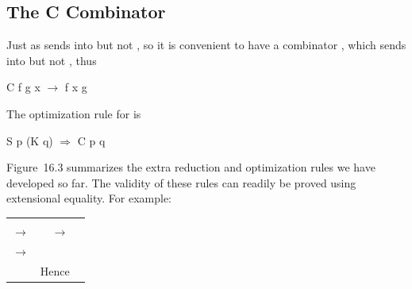 \subsection{The C Combinator}

Just as  sends  into  but not , so it is convenient to have a
combinator , which sends  into  but not , thus
\begin{mlcoded}
    C f g x $\rightarrow$ f x g
\end{mlcoded}
The optimization rule for  is
\begin{mlcoded}
    S p (K q) $\Rightarrow$ C p q
\end{mlcoded}

Figure~16.3 summarizes the extra reduction and optimization rules we have
developed so far. The validity of these rules can readily be proved using
extensional equality. For example:
\begin{mlcoded}
    \begin{tabular}{ll@{\qquad\quad}ll}
        & \ml{S (K p) q x} & & \ml{B p q x} \\
        $\rightarrow$ & \ml{K p x (q x)} & $\rightarrow$ & \ml{p (q x)} \\
        $\rightarrow$ & \ml{p (q x)} \\
        &\multicolumn{3}{l}{{\normalfont\normalsize Hence} \ml{S (K p) q = B p q}}
    \end{tabular}
\end{mlcoded}


